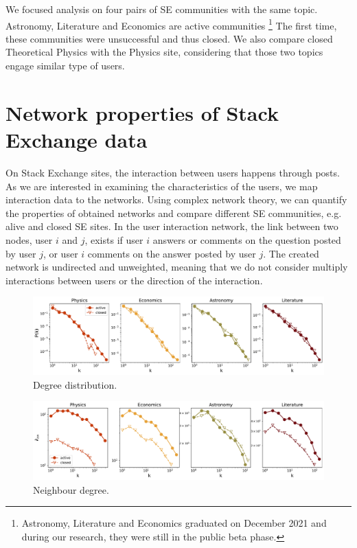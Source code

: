 We focused analysis on four pairs of SE communities with the same topic. Astronomy, Literature and Economics are active communities \footnote{Astronomy, Literature and Economics graduated on December 2021 and during our research, they were still in the public beta phase.} The first time, these communities were unsuccessful and thus closed. We also compare closed Theoretical Physics with the Physics site, considering that those two topics engage similar type of users.

\section{Network properties of Stack Exchange data}

On Stack Exchange sites, the interaction between users happens through posts. As we are interested in examining the characteristics of the users, we map interaction data to the networks. Using complex network theory, we can quantify the properties of obtained networks and compare different SE communities, e.g. alive and closed SE sites. 
In the user interaction network, the link between two nodes, user $i$ and $j$, exists if user $i$ answers or comments on the question posted by user $j$, or user $i$ comments on the answer posted by user $j$. The created network is undirected and unweighted, meaning that we do not consider multiply interactions between users or the direction of the interaction. 


\begin{figure}[h]
	\centering
	\includegraphics[width=\linewidth]{figures/stackexchange/degree_distribution_fullnet.pdf}%
	\caption{Degree distribution.}
	\label{fig:fullnetdeg}
\end{figure}

\begin{figure}[h]
	\centering
	\includegraphics[width=\linewidth]{figures/stackexchange/neighdeg_fullnet.pdf}%
	\caption{Neighbour degree.}
	\label{fig:fullneighdeg}
\end{figure}

